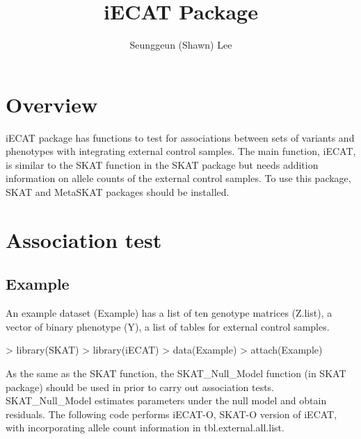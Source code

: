 \documentclass{article}
\begin{document}
\title{iECAT Package}
\author{Seunggeun (Shawn) Lee}
\maketitle

\section{Overview}
iECAT package has functions to test for associations between sets of variants and phenotypes with integrating external control samples. 
The main function, iECAT, is similar to the SKAT function in the SKAT package but needs addition information on allele counts of the external control samples. 
To use this package, SKAT and MetaSKAT packages should be installed. 

\section{Association test}

\subsection{Example}
An example dataset (Example) has a list of ten genotype matrices (Z.list), a vector of binary phenotype (Y), a list of tables for external control samples. 

\begin{Schunk}
\begin{Sinput}
> library(SKAT)
> library(iECAT)
> data(Example)
> attach(Example)
\end{Sinput}
\end{Schunk}

As the same as the SKAT function, the SKAT\_Null\_Model function (in SKAT package) should be used in prior to carry out association tests. 
SKAT\_Null\_Model estimates parameters under the null model and obtain residuals. The following code performs iECAT-O, SKAT-O version of iECAT, 
with incorporating allele count information in tbl.external.all.list. 
\end{document}
